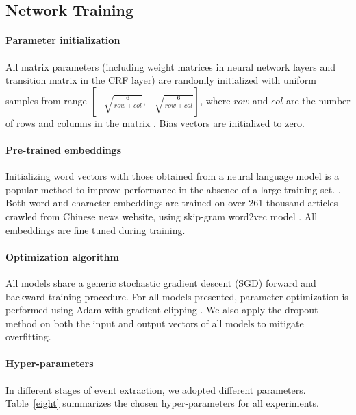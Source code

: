 \subsection{Network Training}
\paragraph{Parameter initialization} All matrix parameters (including weight matrices in neural network layers and
transition matrix in the CRF layer) are randomly initialized with uniform samples from range
$[-\sqrt{\frac{6}{row+col}}, +\sqrt{\frac{6}{row+col}}]$, where $row$ and $col$ are the number of rows and columns in
the matrix \cite{glorot2010understanding}. Bias vectors are initialized to zero.

\paragraph{Pre-trained embeddings} Initializing word vectors with those obtained from a neural language model is a
popular method to improve performance in the absence of a large training set. \cite{collobert2011natural}. Both word
and character embeddings are trained on over 261 thousand articles crawled from Chinese news website, using skip-gram
word2vec model \cite{mikolov2013distributed}. All embeddings are fine tuned during training.

\paragraph{Optimization algorithm} All models share a generic stochastic gradient descent (SGD) forward and backward
training procedure. For all models presented, parameter optimization is performed using Adam \cite{kingma2014adam} with
gradient clipping \cite{pascanu2013difficulty}. We also apply the dropout method \cite{srivastava2014dropout} on both
the input and output vectors of all models to mitigate overfitting.

\paragraph{Hyper-parameters} In different stages of event extraction, we adopted different parameters.
Table~\ref{eight} summarizes the chosen hyper-parameters for all experiments.

